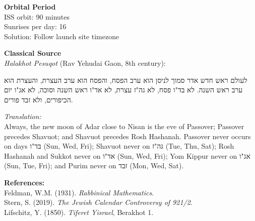 \begin{technical}
\textbf{Orbital Period}\\[0.3em]
ISS orbit: 90 minutes\\
Sunrises per day: 16\\
Solution: Follow launch site timezone

\textbf{Classical Source}\\[0.3em]
\textit{Halakhot Pesuqot} (Rav Yehudai Gaon, 8th century):

\begin{hebrew}
לעולם ראש חדש אדר סמוך לניסן הוא ערב הפסח,
והפסח הוא ערב העצרת,
והעצרת הוא ערב ראש השנה.
לא בד"ו פסח,
לא גה"ז עצרת,
לא אד"ו ראש השנה וסוכה,
לא אג"ו יום הכיפורים,
ולא זבד פורים.
\end{hebrew}

\textit{Translation:}\\
Always, the new moon of Adar close to Nisan is the eve of Passover; Passover precedes Shavuot; and Shavuot precedes Rosh Hashanah. Passover never occurs on days בּד"ו (Sun, Wed, Fri); Shavuot never on גּה"ז (Tue, Thu, Sat); Rosh Hashanah and Sukkot never on אד"ו (Sun, Wed, Fri); Yom Kippur never on אג"ו (Sun, Tue, Fri); and Purim never on זבד (Mon, Wed, Sat).

\vspace{0.5em}
\textbf{References:}\\
{\footnotesize
Feldman, W.M. (1931). \textit{Rabbinical Mathematics}.\\
Stern, S. (2019). \textit{The Jewish Calendar Controversy of 921/2}.\\
Lifschitz, Y. (1850). \textit{Tiferet Yisrael}, Berakhot 1.
}
\end{technical}